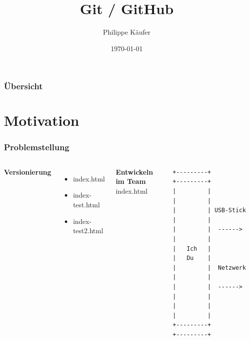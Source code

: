 \documentclass{beamer}
\title[Git / GitHub ]{Git / GitHub} %
\author{Philippe Käufer}
\institute[HACK TO THE FUTURE] %
{
\textit{BY Philippe Käufer (Lizenz: CC BY-NC-SA 3.0)} \\
HACK TO THE FUTURE \\ %
\medskip
}
\date{\today} %
\begin{document}
\begin{frame}
\titlepage %
\end{frame}

\begin{frame}
\frametitle{Übersicht} %
\tableofcontents %
\end{frame}


\section{Motivation}

\begin{frame}[fragile]
\frametitle{Problemstellung}
\begin{columns}
    \textbf{Versionierung}\smallskip
    \begin{itemize}
    \item index.html
    \pause \item index-test.html
    \pause \item index-test2.html 
    \end{itemize}

    \pause \textbf{Entwickeln im Team}\bigskip
    \\index.html
    
	\fontsize{8pt}{1.2}\selectfont
    \begin{verbatim}
+---------+           +---------+
|         |           |         |
|         | USB-Stick |         |
|         |  ------>  |         |
|   Ich   |           |   Du    |
|         |  Netzwerk |         |
|         |  ------>  |         |
|         |           |         |
+---------+           +---------+
    \end{verbatim}

  \end{columns}
\end{frame}
\end{document}

